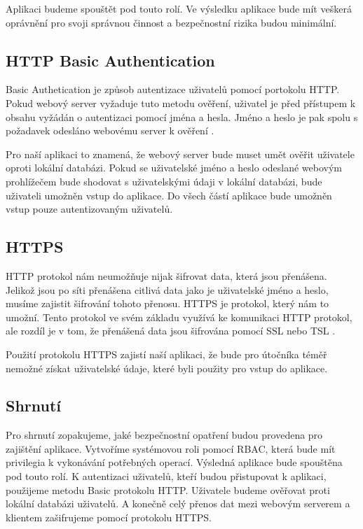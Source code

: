     Aplikaci budeme spouštět pod touto rolí. Ve výsledku aplikace bude mít veškerá oprávnění pro svoji správnou činnost a bezpečnostní rizika budou minimální.
    \subsection{HTTP Basic Authentication}
    \label{httpauth}
    Basic Authetication je způsob autentizace uživatelů pomocí portokolu HTTP. Pokud webový server vyžaduje tuto metodu ověření, uživatel je před přístupem k obsahu vyžádán o autentizaci pomocí jména a hesla. Jméno a heslo je pak spolu s požadavek odesláno webovému server k ověření \cite{RFC2617}.

    Pro naší aplikaci to znamená, že webový server bude muset umět ověřit uživatele oproti lokální databázi. Pokud se uživatelské jméno a heslo odeslané webovým prohlížečem bude shodovat s uživatelskými údaji v lokální databázi, bude uživateli umožněn vstup do aplikace. Do všech částí aplikace bude umožněn vstup pouze autentizovaným uživatelů.

    \subsection{HTTPS}
    \label{https}
    HTTP protokol nám neumožňuje nijak šifrovat data, která jsou přenášena. Jelikož jsou po síti přenášena citlivá data jako je uživatelské jméno a heslo, musíme zajistit šifrování tohoto přenosu. HTTPS je protokol, který nám to umožní. Tento protokol ve svém základu využívá ke komunikaci HTTP protokol, ale rozdíl je v tom, že přenášená data jsou šifrována pomocí SSL nebo TSL \cite{RFC2818}.

    Použití protokolu HTTPS zajistí naší aplikaci, že bude pro útočníka téměř nemožné získat uživatelské údaje, které byli použity pro vstup do aplikace.
    \subsection{Shrnutí}
    Pro shrnutí zopakujeme, jaké bezpečnostní opatření budou provedena pro zajištění aplikace. Vytvoříme systémovou roli pomocí RBAC, která bude mít privilegia k vykonávání potřebných operací. Výsledná aplikace bude spouštěna pod touto rolí. K autentizaci uživatelů, kteří budou přistupovat k aplikaci, použijeme metodu Basic protokolu HTTP. Uživatele budeme ověřovat proti lokální databázi uživatelů. A konečně celý přenos dat mezi webovým serverem a klientem zašifrujeme pomocí protokolu HTTPS.

